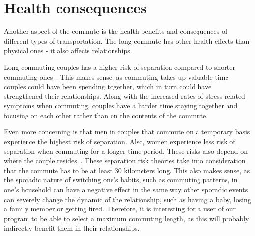 \section{Health consequences}\label{sec:health-consequences}

Another aspect of the commute is the health benefits and consequences of different types of transportation.
The long commute has other health effects than physical ones - it also affects relationships.

Long commuting couples has a higher risk of separation compared to shorter commuting ones~\cite{sandow2011}.
This makes sense, as commuting takes up valuable time couples could have been spending together, which in turn could
have strengthened their relationships.
Along with the increased rates of stress-related symptoms when commuting, couples have a harder time staying together
and focusing on each other rather than on the contents of the commute.

Even more concerning is that men in couples that commute on a temporary basis experience the highest risk of separation.
Also, women experience less risk of separation when commuting for a longer time period.
These risks also depend on where the couple resides~\cite{sandow2011}.
These separation risk theories take into consideration that the commute has to be at least 30 kilometers long.
This also makes sense, as the sporadic nature of switching one's habits, such as commuting patterns, in one's household
can have a negative effect in the same way other sporadic events can severely change the dynamic of the relationship,
such as having a baby, losing a family member or getting fired.
Therefore, it is interesting for a user of our program to be able to select a maximum commuting length, as this will
probably indirectly benefit them in their relationships.



